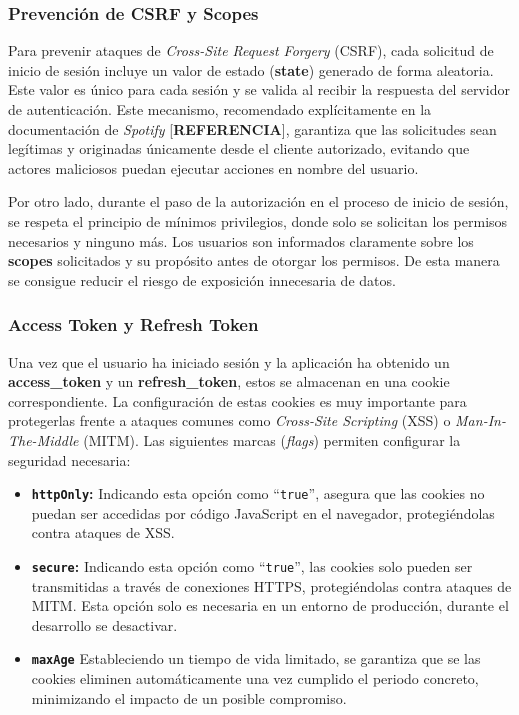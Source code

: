 \subsubsection*{Prevención de CSRF y Scopes}

Para prevenir ataques de \textit{Cross-Site Request Forgery} (CSRF), cada solicitud de inicio de sesión incluye un valor de estado (\textbf{state}) generado de forma aleatoria. Este valor es único para cada sesión y se valida al recibir la respuesta del servidor de autenticación. Este mecanismo, recomendado explícitamente en la documentación de \textit{Spotify} [\textbf{REFERENCIA}], garantiza que las solicitudes sean legítimas y originadas únicamente desde el cliente autorizado, evitando que actores maliciosos puedan ejecutar acciones en nombre del usuario.

Por otro lado, durante el paso de la autorización en el proceso de inicio de sesión, se respeta el principio de mínimos privilegios, donde solo se solicitan los permisos necesarios y ninguno más. Los usuarios son informados claramente sobre los \textbf{scopes} solicitados y su propósito antes de otorgar los permisos. De esta manera se consigue reducir el riesgo de exposición innecesaria de datos.

\subsubsection*{Access Token y Refresh Token}

Una vez que el usuario ha iniciado sesión y la aplicación ha obtenido un \textbf{access\_token} y un \textbf{refresh\_token}, estos se almacenan en una cookie correspondiente. La configuración de estas cookies es muy importante para protegerlas frente a ataques comunes como \textit{Cross-Site Scripting} (XSS) o \textit{Man-In-The-Middle} (MITM). Las siguientes marcas (\textit{flags}) permiten configurar la seguridad necesaria:

\begin{itemize}
    \item \textbf{\texttt{httpOnly}:} Indicando esta opción como ``\texttt{true}'', asegura que las cookies no puedan ser accedidas por código JavaScript en el navegador, protegiéndolas contra ataques de XSS.
    \item \textbf{\texttt{secure}:} Indicando esta opción como ``\texttt{true}'', las cookies solo pueden ser transmitidas a través de conexiones HTTPS, protegiéndolas contra ataques de MITM. Esta opción solo es necesaria en un entorno de producción, durante el desarrollo se desactivar.
    \item \textbf{\texttt{maxAge}} Estableciendo un tiempo de vida limitado, se garantiza que se las cookies eliminen automáticamente una vez cumplido el periodo concreto, minimizando el impacto de un posible compromiso.
\end{itemize}

